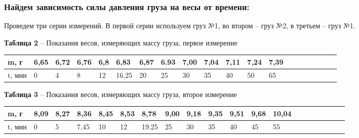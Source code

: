 \documentclass[12pt,a4paper]{article}
\begin{document}
        \subsubsection{Найдем зависимость силы давления груза на весы от времени:}
        Проведем три серии измерений. В первой серии используем груз №1,  во втором -- груз №2, в третьем -- груз №1.
        \begin{table}[!h]
        \begin{flushleft}
       		\hspace{30}\textbf{Таблица 2} -- Показания весов, измеряющих массу груза, первое измерение \\
        \end{flushleft}
            \begin{center}
                \begin{tabular}{ | l | l | l | l | l | l | l | l | l | l |l | l | l | l | l | l | l | l | l | l |}
                \hline
                m, г    &  6,65    &   6,72    &   6,76    &   6,8 &   6,83    &   6,87     &  6.93    &   7,00    &   7,04    &   7,11    &  7,24     &  7,39 \\
                \hline
                t, мин    &  0       &   4       &   8       &   12  &   16,25   &   20       &   25     &   30      &   35      &   40      &  50       &   65  \\
                \hline                
                \end{tabular}
            \end{center}
        \end{table}
       
        \begin{table}[!h]
        \begin{flushleft}
       		\hspace{30}\textbf{Таблица 3} -- Показания весов, измеряющих массу груза, второе измерение \\
        \end{flushleft}
            \begin{center}
                \begin{tabular}{| l | l | l | l | l | l | l | l | l | l |l | l | l | l | l | l | l | l | l | l |}
                \hline
                 m, г    &  8,09    &   8,27    &   8,36    &   8,45    &   8,53    &   8,78     &   9,00    &  9,18    &   9,35    &   9,51    &   9,68    &  10,04 \\
                \hline
                t, мин    &  0       &   5       &   7,45    &   10      &   12      &   19.25   &   25      &    30     &   35      &   40      &   45      &  55    \\
                \hline                
                \end{tabular}
            \end{center}
        \end{table}
       
\end{document}
